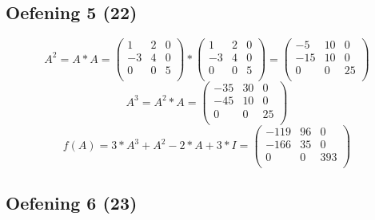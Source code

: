 \documentclass[lineaire_algebra_oplossingen.tex]{subfiles}
\begin{document}
\subsection{Oefening 5 (22)}
\[
   A^2 = A*A = \left( \begin{array}{ccc}
    1 & 2 & 0 \\
    -3 & 4 & 0 \\
    0 & 0 & 5 \\
  \end{array} \right) * \left( \begin{array}{ccc}
    1 & 2 & 0 \\
    -3 & 4 & 0 \\
    0 & 0 & 5 \\
  \end{array} \right) = \left( \begin{array}{ccc}
    -5 & 10 & 0 \\
    -15 & 10 & 0 \\
    0 & 0 & 25 \\
  \end{array} \right) 
  \]
\[ 
  A^3 = A^2 * A = \left( \begin{array}{ccc}
    -35 & 30 & 0 \\
    -45 & 10 & 0 \\
    0 & 0 & 25 \\
  \end{array} \right)
\]
\[
f(A) = 3*A^3 + A^2 - 2*A + 3*I =  \left( \begin{array}{ccc}
    -119 & 96 & 0 \\
    -166 & 35 & 0 \\
    0 & 0 & 393 \\
  \end{array} \right)
\]
\subsection{Oefening 6 (23)}
\end{document}
